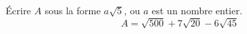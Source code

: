 \'Ecrire $A$ sous la forme $a\sqrt{5}$, ou $a$ est un nombre entier.
\[A=\sqrt{500} +   7\sqrt{20} - 6\sqrt{45}\] 